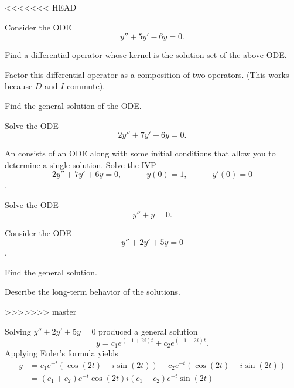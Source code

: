 
\begin{applicationActivities}

<<<<<<< HEAD
=======
\begin{activity}{5}
Consider the ODE \[y''+5y'-6y=0.\]
\vfill
\begin{subactivity}
Find a differential operator whose kernel is the solution set of the above ODE.
\end{subactivity}
\begin{subactivity}
Factor this differential operator as a composition of two operators. (This works because \(D\) and \(I\) commute).
\end{subactivity}
\begin{subactivity}
Find the general solution of the ODE.
\end{subactivity}
\end{activity}

\begin{activity}{5}
Solve the ODE \[ 2y''+7y'+6y=0.\]
\end{activity}

\begin{activity}{5}
An  consists of an ODE along with some initial conditions that allow you to determine a single solution.
\vfill
Solve the IVP \[2y''+7y'+6y=0, \hspace{3em} y(0)=1, \hspace{3em} y'(0)=0\].
\end{activity}

\begin{activity}{5}
Solve the ODE \[ y''+y=0.\]
\end{activity}

\begin{activity}{15}
Consider the ODE \[y''+2y'+5y=0\].
\vfill
\begin{subactivity}
Find the general solution.
\end{subactivity}
\begin{subactivity}
Describe the long-term behavior of the solutions.
\end{subactivity}
\end{activity}
>>>>>>> master

\begin{observation}
Solving \(y''+2y'+5y=0\) produced a general solution
\[y=c_1 e^{(-1+2i)t}+c_2 e^{(-1-2i)t}.\]
Applying Euler's formula yields
 \begin{alignat*}{2}
y&=c_1e^{-t} \left(\cos(2t)+i\sin(2t)\right)+c_2 e^{-t} \left(\cos(2t)-i\sin(2t)\right) \\
&=(c_1+c_2)e^{-t} \cos(2t) i(c_1-c_2) e^{-t} \sin(2t)
\end{alignat*}


\end{observation}
\end{applicationActivities}
